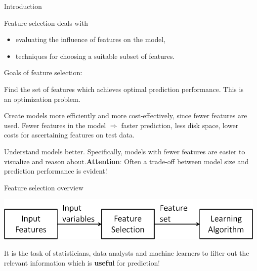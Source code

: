 








\begin{vbframe}{Introduction}

Feature selection deals with
\begin{itemize}
\item evaluating the influence of features on the model,
\item techniques for choosing a suitable subset of features.
\end{itemize}


\begin{blocki}{Goals of feature selection:}
  \item Find the set of features which achieves optimal prediction performance. This is an optimization problem.
  \item Create models more efficiently and more cost-effectively, since fewer features are used.
  Fewer features in the model $\Longrightarrow$ faster prediction, less disk space, lower costs for ascertaining features on test data.
  \item Understand models better. Specifically, models with fewer features are easier to visualize and reason about.\linebreak \textbf{Attention}: Often a trade-off between model size and prediction performance is evident!
\end{blocki}
\end{vbframe}


\begin{vbframe}{Feature selection overview}
\begin{center}
\includegraphics{figure_man/varsel_overview.png}
\end{center}

\lz

It is the task of statisticians, data analysts and machine learners to filter out the relevant information which is \textbf{useful} for prediction!
\end{vbframe}


